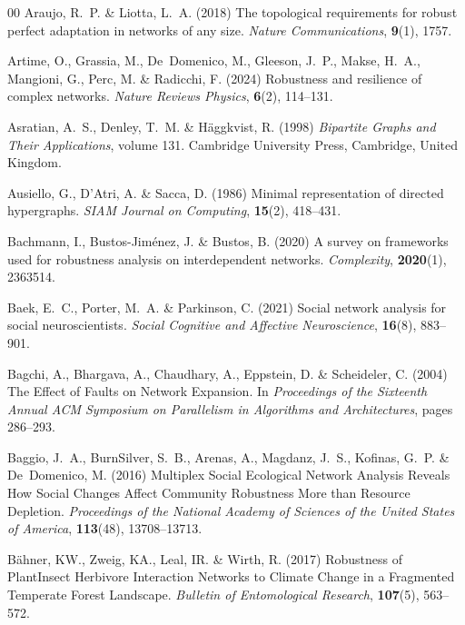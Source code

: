 \documentclass{comnet-mod}
\begin{document}
\begin{thebibliography}{00}
Araujo, R.~P. {\&} Liotta, L.~A. (2018)  The topological requirements for
  robust perfect adaptation in networks of any size. {\em {Nature
  Communications}}, \textbf{9}(1), 1757.

Artime, O., Grassia, M., De~Domenico, M., Gleeson, J.~P., Makse, H.~A.,
  Mangioni, G., Perc, M. {\&} Radicchi, F. (2024)  Robustness and resilience of
  complex networks. {\em {Nature Reviews Physics}}, \textbf{6}(2), 114--131.

Asratian, A.~S., Denley, T.~M. {\&} H{\"a}ggkvist, R. (1998) {\em {Bipartite
  Graphs and Their Applications}}, volume 131.
{Cambridge University Press}, {Cambridge, United Kingdom}.

Ausiello, G., D’Atri, A. {\&} Sacca, D. (1986)  Minimal representation of
  directed hypergraphs. {\em {SIAM Journal on Computing}}, \textbf{15}(2),
  418--431.

Bachmann, I., Bustos-Jim{\'e}nez, J. {\&} Bustos, B. (2020)  A survey on
  frameworks used for robustness analysis on interdependent networks. {\em
  Complexity}, \textbf{2020}(1), 2363514.

Baek, E.~C., Porter, M.~A. {\&} Parkinson, C. (2021)  Social network analysis
  for social neuroscientists. {\em {Social Cognitive and Affective
  Neuroscience}}, \textbf{16}(8), 883--901.

Bagchi, A., Bhargava, A., Chaudhary, A., Eppstein, D. {\&} Scheideler, C.
  (2004)  {The Effect of Faults on Network Expansion}. In {\em {Proceedings of
  the Sixteenth Annual {{ACM}} Symposium on {{Parallelism}} in Algorithms and
  Architectures}}, pages 286--293.

Baggio, J.~A., BurnSilver, S.~B., Arenas, A., Magdanz, J.~S., Kofinas, G.~P.
  {\&} De~Domenico, M. (2016)  {Multiplex Social Ecological Network Analysis
  Reveals How Social Changes Affect Community Robustness More than Resource
  Depletion}. {\em {Proceedings of the National Academy of Sciences of the
  United States of America}}, \textbf{113}(48), 13708--13713.

B{\"a}hner, {\relax KW}., Zweig, {\relax KA}., Leal, {\relax IR}. {\&} Wirth,
  R. (2017)  {Robustness of Plant\textendash Insect Herbivore Interaction
  Networks to Climate Change in a Fragmented Temperate Forest Landscape}. {\em
  {Bulletin of Entomological Research}}, \textbf{107}(5), 563--572.


\end{thebibliography}
\end{document}
